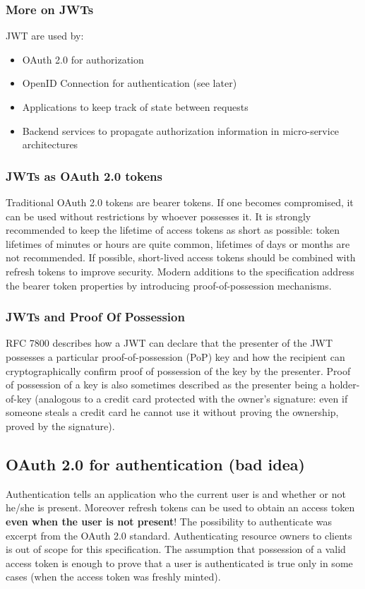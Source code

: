 \documentclass[a4paper, 10pt, titlepage]{article}
\begin{document}
\subsubsection{More on JWTs}
JWT are used by:
\begin{itemize}
\item OAuth 2.0 for authorization
\item OpenID Connection for authentication (see later)
\item Applications to keep track of state between requests
\item Backend services to propagate authorization information in micro-service architectures
\end{itemize}

\subsubsection*{JWTs as OAuth 2.0 tokens}
Traditional OAuth 2.0 tokens are bearer tokens. If one becomes compromised, it can be used without restrictions by whoever
possesses it. It is strongly recommended to keep the lifetime of access tokens as short as possible: token lifetimes of minutes or hours are quite common, lifetimes of days or months are not recommended. If possible, short-lived access tokens should be combined with refresh tokens to improve security. Modern additions to the specification address the bearer token properties by introducing proof-of-possession mechanisms. 
\subsubsection*{JWTs and Proof Of Possession}
RFC 7800 describes how a JWT can declare that the presenter of the JWT possesses a particular proof-of-possession (PoP) key and how the recipient can cryptographically confirm proof of possession of the key by the presenter. Proof of possession of a key is also sometimes described as the presenter being a holder-of-key (analogous to a credit card protected with the owner’s signature: even if someone steals a credit card he cannot use it without proving the ownership, proved by the signature).

\subsection{OAuth 2.0 for authentication (bad idea)}
Authentication tells an application who the current user is and whether or not he/she is present. Moreover refresh tokens can be used to obtain an access token \textbf{even when the user is not present}! The possibility to authenticate was excerpt from the OAuth 2.0 standard. Authenticating resource owners to clients is out of scope for this specification. The assumption that possession of a valid access token is enough to prove that a user is authenticated is true only in some cases (when the access token was freshly minted).
\end{document}
